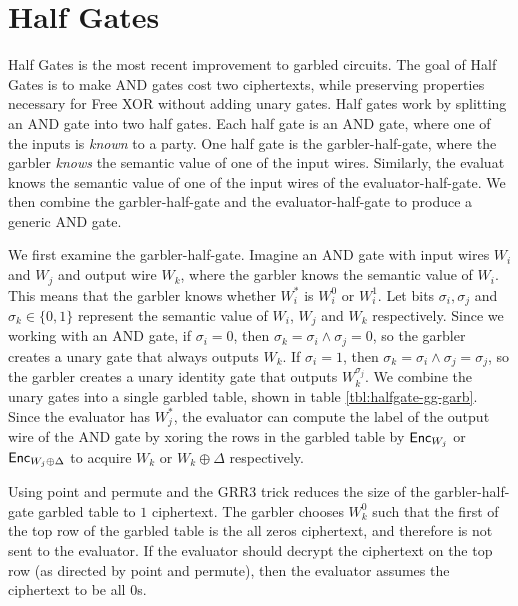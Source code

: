 \section{Half Gates}
Half Gates is the most recent improvement to garbled circuits.
The goal of Half Gates is to make AND gates cost two ciphertexts, while preserving properties necessary for Free XOR without adding unary gates. 
Half gates work by splitting an AND gate into two half gates.
Each half gate is an AND gate, where one of the inputs is \textit{known} to a party.
One half gate is the garbler-half-gate, where the garbler \textit{knows} the semantic value of one of the input wires.
Similarly, the evaluat knows the semantic value of one of the input wires of the evaluator-half-gate.
We then combine the garbler-half-gate and the evaluator-half-gate to produce a generic AND gate.

We first examine the garbler-half-gate.
Imagine an AND gate with input wires $W_i$ and $W_j$ and output wire $W_k$, where the garbler knows the semantic value of $W_i$.
This means that the garbler knows whether $W_i^*$ is $W_i^0$ or $W_i^1$.
Let bits $\sigma_i, \sigma_j$ and $\sigma_k \in \{0,1\}$ represent the semantic value of $W_i$, $W_j$ and $W_k$ respectively.
Since we working with an AND gate, if $\sigma_i = 0$, then $\sigma_k = \sigma_i \wedge \sigma_j = 0$, so the garbler creates a unary gate that always outputs $W_k$.
If $\sigma_i = 1$, then $\sigma_k = \sigma_i \wedge \sigma_j = \sigma_j$, so the garbler creates a unary identity gate that outputs $W_k^{\sigma_j}$.
We combine the unary gates into a single garbled table, shown in table \ref{tbl:halfgate-gg-garb}.
Since the evaluator has $W_j^*$, the evaluator can compute the label of the output wire of the AND gate by xoring the rows in the garbled table by $\textsf{Enc}_{W_j}$ or $\textsf{Enc}_{W_j \oplus \Delta}$ to acquire $W_k$ or $W_k \oplus \Delta$ respectively. 

Using point and permute and the GRR3 trick reduces the size of the garbler-half-gate garbled table to $1$ ciphertext.
The garbler chooses $W_k^0$ such that the first of the top row of the garbled table is the all zeros ciphertext, and therefore is not sent to the evaluator.
If the evaluator should decrypt the ciphertext on the top row (as directed by point and permute), then the evaluator assumes the ciphertext to be all 0s.


